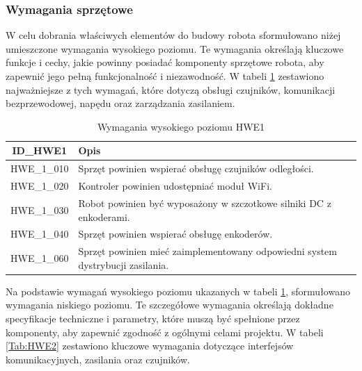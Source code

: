 \documentclass[12pt,twoside]{article}
\begin{document}
\subsubsection{Wymagania sprzętowe}

W celu dobrania właściwych elementów do budowy robota sformułowano niżej umieszczone wymagania wysokiego poziomu. Te wymagania określają kluczowe funkcje i cechy, jakie powinny posiadać komponenty sprzętowe robota, aby zapewnić jego pełną funkcjonalność i niezawodność. W tabeli \ref{Tab:HWE1} zestawiono najważniejsze z tych wymagań, które dotyczą obsługi czujników, komunikacji bezprzewodowej, napędu oraz zarządzania zasilaniem.

\begin{table}[ht]
\caption{Wymagania wysokiego poziomu HWE1}
\centering		
	\begin{tabular}{|c|p{}|}	
		\hline
		ID\_HWE1 & Opis \\
		\hline
		HWE\_1\_010 & Sprzęt powinien wspierać obsługę czujników odległości. \\
		\hline
		HWE\_1\_020 & Kontroler powinien udostępniać moduł WiFi. \\
		\hline 
		HWE\_1\_030 & Robot powinien być wyposażony w szczotkowe silniki DC z enkoderami.\\
		\hline
		HWE\_1\_040 & Sprzęt powinien wspierać obsługę enkoderów. \\
		\hline
		HWE\_1\_060 & Sprzęt powinien mieć zaimplementowany odpowiedni system dystrybucji zasilania. \\
		\hline

	\end{tabular}	
	
\label{Tab:HWE1}
\end{table}	

\newpage

Na podstawie wymagań wysokiego poziomu ukazanych w tabeli \ref{Tab:HWE1}, sformułowano wymagania niskiego poziomu. Te szczegółowe wymagania określają dokładne specyfikacje techniczne i parametry, które muszą być spełnione przez komponenty, aby zapewnić zgodność z ogólnymi celami projektu. W tabeli \ref{Tab:HWE2} zestawiono kluczowe wymagania dotyczące interfejsów komunikacyjnych, zasilania oraz czujników.
\end{document}
